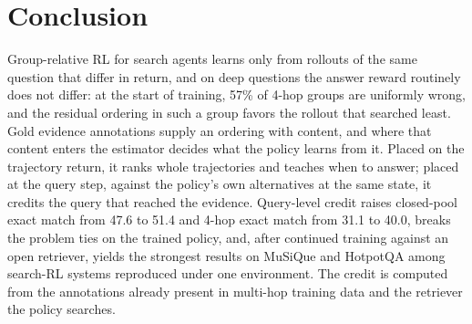 \section{Conclusion}
\label{sec:conclusion}

Group-relative RL for search agents learns only from rollouts of the
same question that differ in return, and on deep questions the answer
reward routinely does not differ: at the start of training, 57\% of
4-hop groups are uniformly wrong, and the residual ordering in such a
group favors the rollout that searched least. Gold evidence annotations
supply an ordering with content, and where that content enters the
estimator decides what the policy learns from it. Placed on the
trajectory return, it ranks whole trajectories and teaches when to
answer; placed at the query step, against the policy's own alternatives
at the same state, it credits the query that reached the evidence.
Query-level credit raises closed-pool exact match from 47.6 to 51.4 and
4-hop exact match from 31.1 to 40.0, breaks the problem ties on the
trained policy, and, after continued training against an open
retriever, yields the strongest results on MuSiQue and HotpotQA among
search-RL systems reproduced under one environment. The credit is computed from
the annotations already present in multi-hop training data and the
retriever the policy searches.
